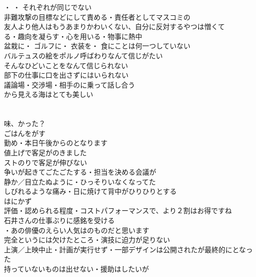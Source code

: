 ・
・
それぞれが同じでない\\

非難攻撃の目標などにして責める・責任者としてマスコミの\\

友人より他人はもうあまりかわいくない、自分に反対するやつは憎くて\\

る・趣向を凝らす・心を用いる・物事に熱中\\
盆栽に・
ゴルフに・
衣装を・
食にことは何一つしていない\\

バルテュスの絵をポルノ呼ばわりなんて信じがたい\\
そんなひどいことをなんて信じられない\\
部下の仕事に口を出さずにはいられない\\

議論場・交渉場・相手のに乗って話し合う\\
から見える海はとても美しい\\
\\
\\

味、かった？\\
ごはんをがす\\
勤め・本日午後からのとなります\\
値上げで客足がのきました\\
ストのりで客足が伸びない\\
争いが起きてごたごたする・担当を決める会議が\\
静か／目立たぬように・ひっそりいなくなってた\\
しびれるような痛み・日に焼けて背中がひりひりとする\\
はにかず\\
評価・認められる程度・コストパフォーマンスで、より２割はお得ですね\\
石井さんの仕事ぶりに感銘を受ける\\
・あの俳優のえらい人気はのものだと思います\\
完全というには欠けたところ・演技に迫力が足りない\\
上演／上映中止・計画が実行せず・一部デザインは公開されたが最終的にとなった\\
持っていないものは出せない・援助はしたいが\\

